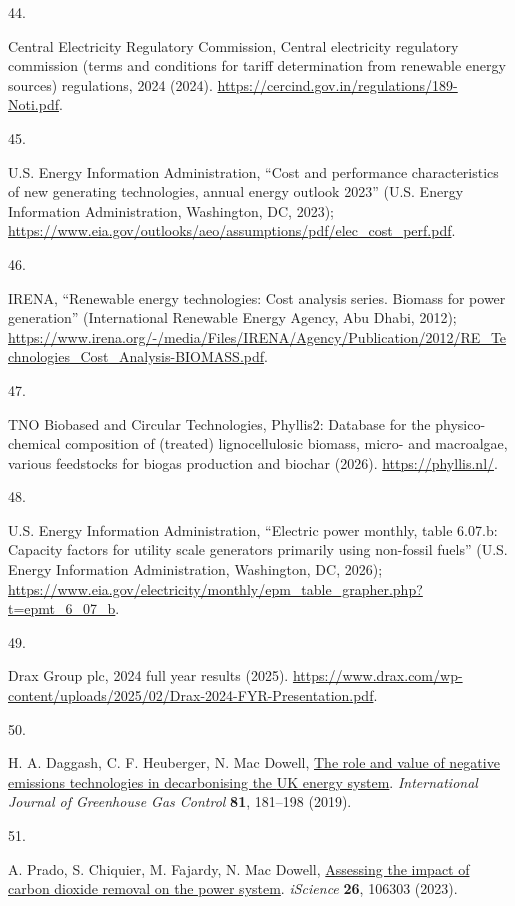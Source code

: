 \documentclass[
  letterpaper,
]{article}
\newlength{\cslhangindent}
\newlength{\csllabelwidth}
\newenvironment{CSLReferences}[2] %
 {\begin{list}{}{%
  \setlength{\itemindent}{0pt}
  \setlength{\leftmargin}{0pt}
  \setlength{\parsep}{0pt}
  \ifodd #1
   \setlength{\leftmargin}{\cslhangindent}
   \setlength{\itemindent}{-1\cslhangindent}
  \fi
  \setlength{\itemsep}{#2\baselineskip}}}
 {\end{list}}
\newcommand{\CSLLeftMargin}[1]{\parbox[t]{\csllabelwidth}{\strut#1\strut}}
\newcommand{\CSLRightInline}[1]{\parbox[t]{\linewidth - \csllabelwidth}{\strut#1\strut}}
\begin{document}
\begin{CSLReferences}{0}{1}
\CSLLeftMargin{44. }%
\CSLRightInline{Central Electricity Regulatory Commission, Central
electricity regulatory commission (terms and conditions for tariff
determination from renewable energy sources) regulations, 2024 (2024).
\url{https://cercind.gov.in/regulations/189-Noti.pdf}.}

\CSLLeftMargin{45. }%
\CSLRightInline{U.S. Energy Information Administration, {``Cost and
performance characteristics of new generating technologies, annual
energy outlook 2023''} (U.S. Energy Information Administration,
Washington, DC, 2023);
\url{https://www.eia.gov/outlooks/aeo/assumptions/pdf/elec_cost_perf.pdf}.}

\CSLLeftMargin{46. }%
\CSLRightInline{IRENA, {``Renewable energy technologies: Cost analysis
series. Biomass for power generation''} (International Renewable Energy
Agency, Abu Dhabi, 2012);
\url{https://www.irena.org/-/media/Files/IRENA/Agency/Publication/2012/RE_Technologies_Cost_Analysis-BIOMASS.pdf}.}

\CSLLeftMargin{47. }%
\CSLRightInline{TNO Biobased and Circular Technologies, Phyllis2:
Database for the physico-chemical composition of (treated)
lignocellulosic biomass, micro- and macroalgae, various feedstocks for
biogas production and biochar (2026). \url{https://phyllis.nl/}.}

\CSLLeftMargin{48. }%
\CSLRightInline{U.S. Energy Information Administration, {``Electric
power monthly, table 6.07.b: Capacity factors for utility scale
generators primarily using non-fossil fuels''} (U.S. Energy Information
Administration, Washington, DC, 2026);
\url{https://www.eia.gov/electricity/monthly/epm_table_grapher.php?t=epmt_6_07_b}.}

\CSLLeftMargin{49. }%
\CSLRightInline{Drax Group plc, 2024 full year results (2025).
\url{https://www.drax.com/wp-content/uploads/2025/02/Drax-2024-FYR-Presentation.pdf}.}

\CSLLeftMargin{50. }%
\CSLRightInline{H. A. Daggash, C. F. Heuberger, N. Mac Dowell,
\href{https://doi.org/10.1016/j.ijggc.2018.12.019}{The role and value of
negative emissions technologies in decarbonising the {UK} energy
system}. \emph{International Journal of Greenhouse Gas Control}
\textbf{81}, 181--198 (2019).}

\CSLLeftMargin{51. }%
\CSLRightInline{A. Prado, S. Chiquier, M. Fajardy, N. Mac Dowell,
\href{https://doi.org/10.1016/j.isci.2023.106303}{Assessing the impact
of carbon dioxide removal on the power system}. \emph{iScience}
\textbf{26}, 106303 (2023).}


\end{CSLReferences}
\end{document}
